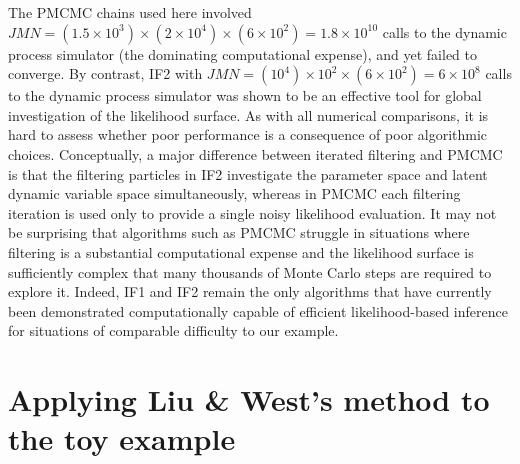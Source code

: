 \documentclass[11pt]{article}
\begin{document}
The PMCMC chains used here involved $JMN=(1.5\times 10^3)\times (2\times 10^4) \times (6\times 10^2)=1.8\times 10^{10}$ calls to the dynamic process simulator (the dominating computational expense), and yet failed to converge.
By contrast, IF2 with  $JMN=(10^4)\times 10^2 \times (6\times 10^2)=6\times 10^8$ calls to the dynamic process simulator was shown to be an effective tool for global investigation of the likelihood surface.
As with all numerical comparisons, it is hard to assess whether poor performance is a consequence of poor algorithmic choices. 
Conceptually, a major difference between iterated filtering and PMCMC is that the filtering particles in IF2 investigate the parameter space and latent dynamic variable space simultaneously, whereas in PMCMC each filtering iteration is used only to provide a single noisy likelihood evaluation.
It may not be surprising that algorithms such as PMCMC struggle in situations where filtering is a substantial computational expense and the likelihood surface is sufficiently complex that many thousands of Monte Carlo steps are required to explore it.
Indeed, IF1 and IF2 remain the only algorithms that have currently been demonstrated computationally capable of efficient likelihood-based inference for situations of comparable difficulty to our example.

\section{Applying Liu \& West's method to the toy example}
\end{document}
